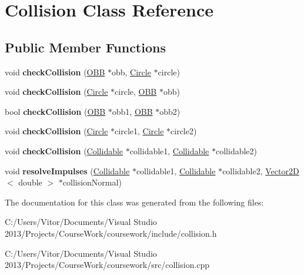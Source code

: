 \hypertarget{class_collision}{}\section{Collision Class Reference}
\label{class_collision}
\subsection*{Public Member Functions}
\begin{DoxyCompactItemize}
\item 
\hypertarget{class_collision_afe7999685b8f1886d4dbb2ce43a6bb29}{}void {\bfseries check\+Collision} (\hyperlink{class_o_b_b}{O\+B\+B} $\ast$obb, \hyperlink{class_circle}{Circle} $\ast$circle)\label{class_collision_afe7999685b8f1886d4dbb2ce43a6bb29}

\item 
\hypertarget{class_collision_a486f62260900e934b3776861d6373995}{}void {\bfseries check\+Collision} (\hyperlink{class_circle}{Circle} $\ast$circle, \hyperlink{class_o_b_b}{O\+B\+B} $\ast$obb)\label{class_collision_a486f62260900e934b3776861d6373995}

\item 
\hypertarget{class_collision_a8fcea4d350d740f1578c55cff95ba08f}{}bool {\bfseries check\+Collision} (\hyperlink{class_o_b_b}{O\+B\+B} $\ast$obb1, \hyperlink{class_o_b_b}{O\+B\+B} $\ast$obb2)\label{class_collision_a8fcea4d350d740f1578c55cff95ba08f}

\item 
\hypertarget{class_collision_a14f2ada41144c2df70bd900f95744b6e}{}void {\bfseries check\+Collision} (\hyperlink{class_circle}{Circle} $\ast$circle1, \hyperlink{class_circle}{Circle} $\ast$circle2)\label{class_collision_a14f2ada41144c2df70bd900f95744b6e}

\item 
\hypertarget{class_collision_a4038ffe9c7bfe8cf345871daa905d200}{}void {\bfseries check\+Collision} (\hyperlink{class_collidable}{Collidable} $\ast$collidable1, \hyperlink{class_collidable}{Collidable} $\ast$collidable2)\label{class_collision_a4038ffe9c7bfe8cf345871daa905d200}

\item 
\hypertarget{class_collision_a4b1135376307e6a3d0de0d2b7bb64e68}{}void {\bfseries resolve\+Impulses} (\hyperlink{class_collidable}{Collidable} $\ast$collidable1, \hyperlink{class_collidable}{Collidable} $\ast$collidable2, \hyperlink{class_vector2_d}{Vector2\+D}$<$ double $>$ $\ast$collision\+Normal)\label{class_collision_a4b1135376307e6a3d0de0d2b7bb64e68}

\end{DoxyCompactItemize}


The documentation for this class was generated from the following files\+:\begin{DoxyCompactItemize}
\item 
C\+:/\+Users/\+Vitor/\+Documents/\+Visual Studio 2013/\+Projects/\+Course\+Work/coursework/include/collision.\+h\item 
C\+:/\+Users/\+Vitor/\+Documents/\+Visual Studio 2013/\+Projects/\+Course\+Work/coursework/src/collision.\+cpp\end{DoxyCompactItemize}
